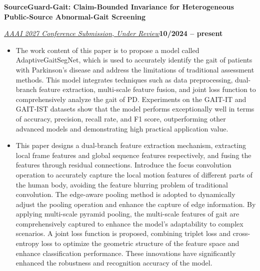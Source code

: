 \documentclass[10pt,a4paper]{article}
\newcommand{\titleline}[1]{\par\vspace{0.80bp}\noindent\textbf{#1}\par\vspace{0.50bp}}
\newcommand{\metaline}[2]{%
  \par\noindent\uline{\textit{#1}}\hfill\textbf{#2}\par\vspace{0.50bp}%
}
\let\venueline\metaline
\newenvironment{cvitems}{%
  \begin{itemize}[leftmargin=14.20bp,labelwidth=4.20bp,labelsep=10.00bp,align=left,
    topsep=0bp,itemsep=0bp,parsep=0bp,partopsep=0bp,label={\textbullet}]
}{\end{itemize}}
\begin{document}
\titleline{SourceGuard-Gait: Claim-Bounded Invariance for Heterogeneous Public-Source Abnormal-Gait Screening}
\venueline{AAAI 2027 Conference Submission, Under Review}{10/2024 -- present}
\begin{cvitems}
\item The work content of this paper is to propose a model called AdaptiveGaitSegNet, which is used to accurately identify the gait of patients with Parkinson's disease and address the limitations of traditional assessment methods. This model integrates techniques such as data preprocessing, dual-branch feature extraction, multi-scale feature fusion, and joint loss function to comprehensively analyze the gait of PD. Experiments on the GAIT-IT and GAIT-IST datasets show that the model performs exceptionally well in terms of accuracy, precision, recall rate, and F1 score, outperforming other advanced models and demonstrating high practical application value.
\item This paper designs a dual-branch feature extraction mechanism, extracting local frame features and global sequence features respectively, and fusing the features through residual connections. Introduce the focus convolution operation to accurately capture the local motion features of different parts of the human body, avoiding the feature blurring problem of traditional convolution. The edge-aware pooling method is adopted to dynamically adjust the pooling operation and enhance the capture of edge information. By applying multi-scale pyramid pooling, the multi-scale features of gait are comprehensively captured to enhance the model's adaptability to complex scenarios. A joint loss function is proposed, combining triplet loss and cross-entropy loss to optimize the geometric structure of the feature space and enhance classification performance. These
innovations have significantly enhanced the robustness and recognition accuracy of the model.
\end{cvitems}
\end{document}
